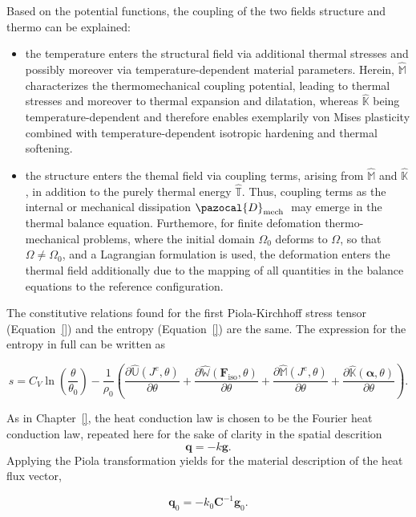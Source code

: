 Based on the potential functions, the coupling of the two fields structure and thermo can be explained:
\begin{itemize}
  \item the temperature enters the structural field via additional thermal stresses and possibly moreover via temperature-dependent material parameters.
  Herein, \(\hat{\mathbb{M}}\) characterizes the thermomechanical coupling potential, leading to thermal stresses and moreover to thermal expansion and dilatation, whereas \(\hat{\mathbb{K}}\) being temperature-dependent and therefore enables exemplarily von Mises plasticity combined with temperature-dependent isotropic hardening and thermal softening.
  \item the structure enters the themal field via coupling terms, arising from \(\hat{\mathbb{M}}\) and \(\hat{\mathbb{K}}\) , in addition to the purely thermal energy \(\hat{\mathbb T}\).
  Thus, coupling terms as the internal or mechanical dissipation \(\pazocal{D}_{\text {mech }}\) may emerge in the thermal balance equation. Furthemore, for finite defomation thermo-mechanical problems, where the initial domain \(\Omega_{0}\) deforms to \(\Omega\), so that \(\Omega \neq \Omega_{0}\), and a Lagrangian formulation is used, the deformation enters the thermal field additionally due to the mapping of all quantities in the balance equations to the reference configuration.
\end{itemize}

The constitutive relations found for the first Piola-Kirchhoff stress tensor (Equation~\eqref{}) and the entropy (Equation~\eqref{}) are the same.
The expression for the entropy in full can be written as
\begin{highlight}
  \begin{equation}
    s = C_{V} \ln \left(\frac{\theta}{\theta_{0}}\right)-\frac{1}{\rho_{0}}\left(\frac{\partial \hat{\mathbb{U}}\left(J^e,\theta\right)}{\partial \theta} + \frac{\partial \hat{\mathbb{W}}(\bm{F}_\text{iso},\theta)}{\partial \theta} + \frac{\partial \hat{\mathbb{M}}\left(J^{e}, \theta\right)}{\partial \theta}+\frac{\partial \hat{\mathbb{K}}\left(\bm \alpha, \theta\right)}{\partial \theta}\right).
  \end{equation}
\end{highlight}

As in Chapter~\ref{}, the heat conduction law is chosen to be the Fourier heat conduction law, repeated here for the sake of clarity in the spatial descrition
\begin{equation}
  \bm q = - k \bm g.
\end{equation}
Applying the Piola transformation yields for the material description of the heat flux vector,
\begin{highlight}
  \begin{equation}
    \bm q_0 = - k_0 \bm C^{-1} \bm g_0.
  \end{equation}
\end{highlight}


